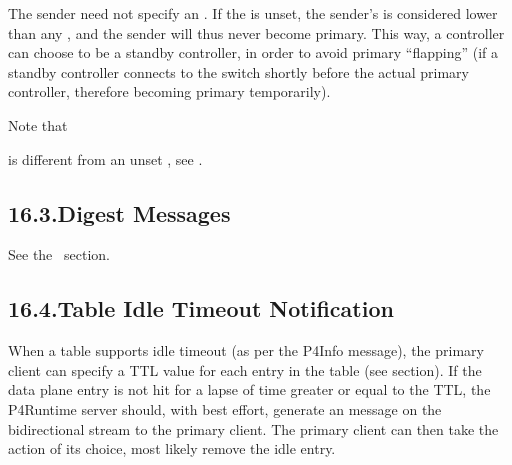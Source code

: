 \documentclass[11pt]{article}
\begin{document}
{%
\noindent{}The sender need not specify an . If the  is
unset, the sender's  is considered lower than any
, and the sender will thus never become primary. This way, a
controller can choose to be a standby controller, in order to avoid primary
\textquotedblleft{}flapping\textquotedblright{} (if a standby controller connects to the switch shortly before the
actual primary controller, therefore becoming primary temporarily).%

Note that%
\begin{mdpre}%
\end{mdpre}\noindent{}is different from an unset , see
.

\subsection{16.3.\hspace*{0.5em}Digest Messages}\label{sec-digest-messages}%

\noindent{}See the~ section.%

\subsection{16.4.\hspace*{0.5em}Table Idle Timeout Notification}\label{sec-table-idle-timeout-notification}%

\noindent{}When a table supports idle timeout (as per the P4Info message), the primary
client can specify a TTL value for each entry in the table (see
 section). If the data plane entry is not hit
for a lapse of time greater or equal to the TTL, the P4Runtime server should,
with best effort, generate an  message on the
 bidirectional stream to the primary client. The primary client
can then take the action of its choice, most likely remove the idle entry.%

}
\end{document}
